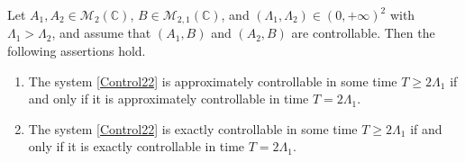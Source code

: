 \begin{lemm}
\label{LemmTime2}
Let $A_1, A_2 \in \mathcal M_2(\mathbb C)$, $B \in \mathcal M_{2, 1}(\mathbb C)$, and $(\Lambda_1, \Lambda_2) \in (0, +\infty)^2$ with $\Lambda_1 > \Lambda_2$, and assume that $(A_1, B)$ and $(A_2, B)$ are controllable. Then the following assertions hold.
\begin{enumerate}
\item The system \eqref{Control22} is approximately controllable in some time $T \geq 2 \Lambda_1$ if and only if it is approximately controllable in time $T = 2 \Lambda_1$.
\item The system \eqref{Control22} is exactly controllable in some time $T \geq 2 \Lambda_1$ if and only if it is exactly controllable in time $T = 2 \Lambda_1$.
\end{enumerate}
\end{lemm}

